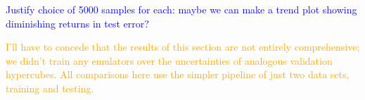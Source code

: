 \textcolor{blue}{Justify choice of 5000 samples for each: maybe we can make a
trend plot showing diminishing returns in test error?}


\textcolor{orange}{I'll have to concede that the results of this section are 
not entirely comprehensive; we didn't train any emulators over the 
uncertainties of analogous validation hypercubes. All comparisons here use the
simpler pipeline of just two data sets, training and testing.}
